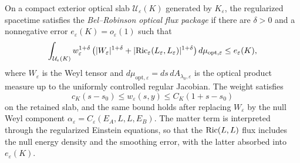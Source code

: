 \begin{definition}\label{def:BelRobinsonOpticalFluxPackage}
On a compact exterior optical slab $\mathcal U_\varepsilon(K)$ generated by $K_\varepsilon$, the regularized spacetime satisfies the \emph{Bel--Robinson optical flux package} if there are $\delta>0$ and a nonnegative error $e_\varepsilon(K)=o_\varepsilon(1)$ such that
\[
    \int_{\mathcal U_\varepsilon(K)}
    w_\varepsilon^{1+\delta}
    \left(
        |W_\varepsilon|^{1+\delta}
        +|\mathrm{Ric}_\varepsilon(L_\varepsilon,L_\varepsilon)|^{1+\delta}
    \right)
    d\mu_{\mathrm{opt},\varepsilon}
    \le e_\varepsilon(K),
\]
where $W_\varepsilon$ is the Weyl tensor and $d\mu_{\mathrm{opt},\varepsilon}=ds\,dA_{\lambda_0,\varepsilon}$ is the optical product measure up to the uniformly controlled regular Jacobian. The weight satisfies
\[
    c_K(s-s_0)\le w_\varepsilon(s,y)\le C_K(1+s-s_0)
\]
on the retained slab, and the same bound holds after replacing $W_\varepsilon$ by the null Weyl component $\alpha_\varepsilon=C_\varepsilon(E_A,L,L,E_B)$. The matter term is interpreted through the regularized Einstein equations, so that the $\mathrm{Ric}(L,L)$ flux includes the null energy density and the smoothing error, with the latter absorbed into $e_\varepsilon(K)$.
\end{definition}

